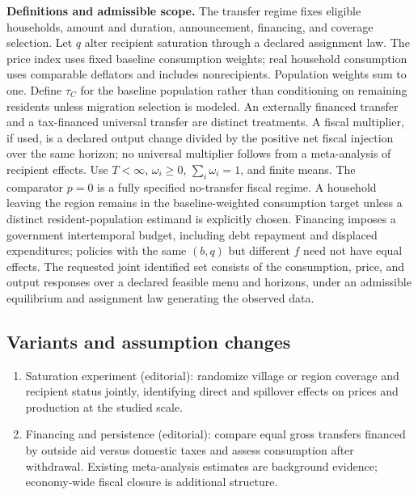 \documentclass[11pt,a4paper]{article}
\begin{document}
\textbf{Definitions and admissible scope.} The transfer regime fixes eligible households, amount and duration, announcement, financing, and coverage selection. Let \(q\) alter recipient saturation through a declared assignment law. The price index uses fixed baseline consumption weights; real household consumption uses comparable deflators and includes nonrecipients. Population weights sum to one. Define \(\tau_C\) for the baseline population rather than conditioning on remaining residents unless migration selection is modeled. An externally financed transfer and a tax-financed universal transfer are distinct treatments. A fiscal multiplier, if used, is a declared output change divided by the positive net fiscal injection over the same horizon; no universal multiplier follows from a meta-analysis of recipient effects. Use \(T<\infty\), \(\omega_i\ge0\), \(\sum_i\omega_i=1\), and finite means. The comparator \(p=0\) is a fully specified no-transfer fiscal regime. A household leaving the region remains in the baseline-weighted consumption target unless a distinct resident-population estimand is explicitly chosen. Financing imposes a government intertemporal budget, including debt repayment and displaced expenditures; policies with the same \((b,q)\) but different \(f\) need not have equal effects. The requested joint identified set consists of the consumption, price, and output responses over a declared feasible menu and horizons, under an admissible equilibrium and assignment law generating the observed data.
\subsection*{Variants and assumption changes}
\begin{enumerate}
\item Saturation experiment (editorial): randomize village or region coverage and recipient status jointly, identifying direct and spillover effects on prices and production at the studied scale.
\item Financing and persistence (editorial): compare equal gross transfers financed by outside aid versus domestic taxes and assess consumption after withdrawal. Existing meta-analysis estimates are background evidence; economy-wide fiscal closure is additional structure.
\end{enumerate}
\end{document}
